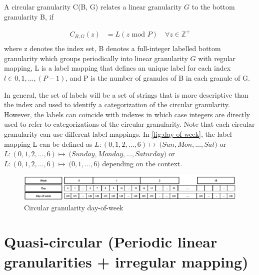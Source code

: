 \documentclass[10pt,a4paper,]{article}
\begin{document}
\begin{definition}\label{def:circular}
A circular granularity C(B, G) relates a linear granularity $G$ to the bottom granularity B, if

\begin{equation} \label{eq:eq5}
\begin{split}
C_{B, G}(z) & = {L}(z\text{~mod~}P) \quad \forall z \in \mathbb{Z}^+ \\
\end{split}
\end{equation}
where
z denotes the index set,
B denotes a full-integer labelled bottom granularity which groups periodically into linear granularity $G$ with regular mapping, 
{L} is a label mapping that defines an unique label for each index $l \in {0,1,\dots, (P-1)}$,
and P is the number of granules of B in each granule of G.
\end{definition}

In general, the set of labels will be a set of strings that is more descriptive than the index and used to identify a categorization of the circular granularity. However, the labels can coincide with indexes in which case integers are directly used to refer to categorizations of the circular granularity. Note that each
circular granularity can use different label mappings. In \autoref{fig:day-of-week}, the label mapping L can be defined as \(L: ({0,1,2, \dots, 6}) \longmapsto\ ({Sun, Mon, \dots, Sat)}\) or \(L: ({0,1,2, \dots, 6}) \longmapsto\ ({Sunday, Monday, \dots, Saturday)}\) or \(L: ({0,1,2, \dots, 6}) \longmapsto\ ({0, 1, \dots, 6)}\)
depending on the context.

\begin{figure}
\includegraphics[width=1\linewidth]{Figs/day-of-week} \caption{Circular granularity day-of-week}\label{fig:day-of-week}
\end{figure}

\hypertarget{quasi-circular-periodic-linear-granularities-irregular-mapping}{%
\section{Quasi-circular (Periodic linear granularities + irregular mapping)}\label{quasi-circular-periodic-linear-granularities-irregular-mapping}}
\end{document}
